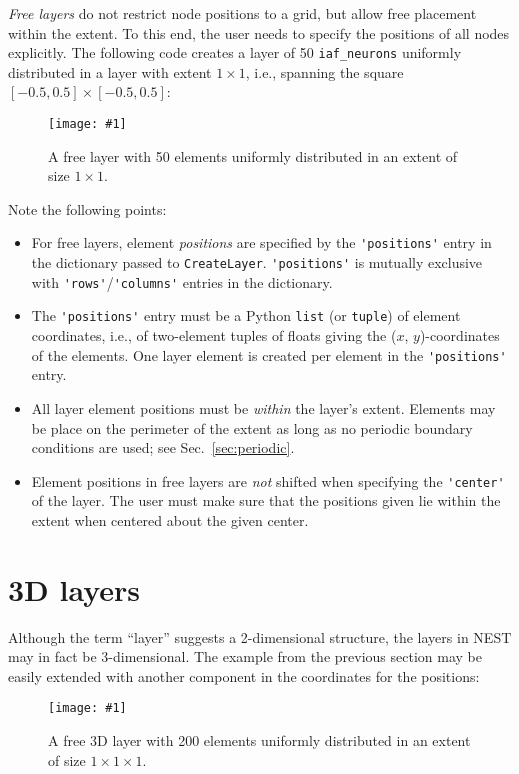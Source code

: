\documentclass[a4paper,12pt]{report}
\newcommand{\scriptfig}[4]{%
\begin{figure}
\centerline{\texttt{[image: \#1]}}
\caption[#3]{#4}
\label{fig:#1}
\end{figure}%
}
\begin{document}
\emph{Free layers} do not restrict node positions to
a grid, but allow free placement within the extent. To this end, the
user needs to specify the positions of all nodes explicitly. The
following code creates a layer of 50 \lstinline!iaf_neurons! uniformly
distributed in a layer with extent $1\times 1$, i.e., spanning the
square $[-0.5,0.5]\times[-0.5,0.5]$:
%

\scriptfig{layer4}{0.5}{Layer with freely spaced elements.}%
{A free layer with 50 elements uniformly distributed in an extent of
size $1\times 1$.}
%
Note the following points:
\begin{itemize}
\item For free layers, element \emph{positions} are
  specified by the \lstinline!'positions'! entry in the dictionary
  passed to \lstinline!CreateLayer!. \lstinline!'positions'! is
  mutually exclusive with \lstinline!'rows'!/\lstinline!'columns'!
  entries in the dictionary.
\item The \lstinline!'positions'! entry must be a Python
  \lstinline!list! (or \lstinline!tuple!) of element coordinates,
  i.e., of two-element tuples of floats giving the ($x$, $y$)-coordinates
  of the elements. One layer element is created per element in the
  \lstinline!'positions'! entry.
\item All layer element positions must be \emph{within} the layer's
  extent. Elements may be place on the perimeter of the extent as long
  as no periodic boundary conditions are used; see Sec.~\ref{sec:periodic}.
\item Element positions in free layers are \emph{not} shifted when
  specifying the \lstinline!'center'! of the layer. The user must make
  sure that the positions given lie within the extent when centered
  about the given center.
\end{itemize}


\section{3D layers}\label{sec:3dlayer}

Although the term ``layer'' suggests a 2-dimensional structure, the layers
in NEST may in fact be 3-dimensional.  The example from
the previous section may be easily extended with another component in the
coordinates for the positions:
%

\scriptfig{layer4_3d}{0.5}{3D layer with freely spaced elements.}%
{A free 3D layer with 200 elements uniformly distributed in an extent of
size $1\times 1\times 1$.}
%
\end{document}
